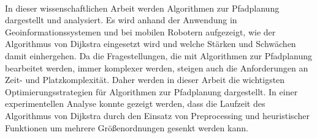 \kurzfassung

\paragraph*{}
In dieser wissenschaftlichen Arbeit werden Algorithmen zur Pfadplanung dargestellt und analysiert. Es wird anhand der Anwendung in Geoinformationssystemen und bei mobilen Robotern aufgezeigt, wie der Algorithmus von Dijkstra eingesetzt wird und welche Stärken und Schwächen damit einhergehen.  Da die Fragestellungen, die mit Algorithmen zur Pfadplanung bearbeitet werden, immer komplexer werden, steigen auch die Anforderungen an Zeit- und Platzkomplexität. Daher werden in dieser Arbeit die wichtigsten Optimierungsstrategien für Algorithmen zur Pfadplanung dargestellt. In einer experimentellen Analyse konnte gezeigt werden, dass die Laufzeit des Algorithmus von Dijkstra durch den Einsatz von Preprocessing und heuristischer Funktionen um mehrere Größenordnungen gesenkt werden kann. 



